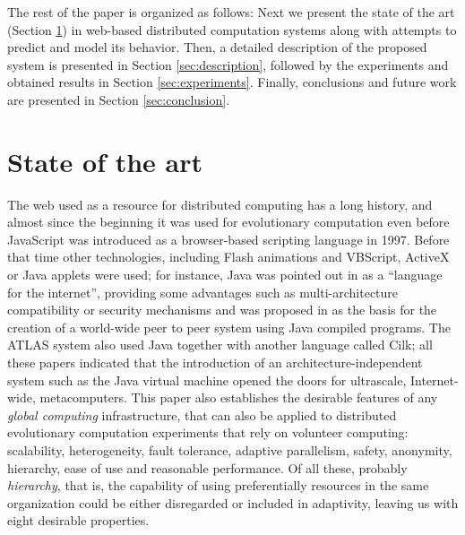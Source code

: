 \documentclass[journal,onecolumn]{IEEEtran}
\begin{document}
The rest of the paper is organized as follows: Next we present the
state of the art (Section \ref{sec:soa}) in web-based distributed
computation systems along with attempts to predict and model its behavior. %
Then, a detailed description of the proposed system is presented
in Section \ref{sec:description}, followed by the experiments and
obtained results in Section \ref{sec:experiments}.
Finally, conclusions and future work are presented in Section \ref{sec:conclusion}.


\section{State of the art}
\label{sec:soa}

The web used as a resource for distributed computing has a
long history, and almost since the beginning it was used for
evolutionary computation even before JavaScript was
introduced as a browser-based scripting language in 1997. Before that
time other technologies,
 including Flash animations and VBScript, ActiveX or Java applets were
used; for instance, Java was pointed out in \cite{soares1998get} as a
``language for the
internet'', providing some advantages such as multi-architecture compatibility or
security mechanisms and was proposed in \cite{chandy1996world} as the
basis for the creation of a world-wide peer to peer system using Java
compiled programs. The ATLAS system
\cite{Baldeschwieler:1996:TIG:504450.504482} also used Java together
with another language called Cilk; all these papers indicated that
the introduction of an architecture-independent system such as the
Java virtual machine opened the doors for ultrascale, Internet-wide,
metacomputers. This paper also establishes the desirable features of
any {\em global computing} infrastructure, that can also be applied to
distributed evolutionary computation experiments that rely on
volunteer computing: scalability, heterogeneity, fault tolerance,
adaptive parallelism, safety, anonymity, hierarchy, ease of use and
reasonable performance. Of all these, probably {\em hierarchy}, that
is, the capability of using preferentially resources in the same
organization could be either disregarded or included in adaptivity,
leaving us with eight desirable properties.
\end{document}
